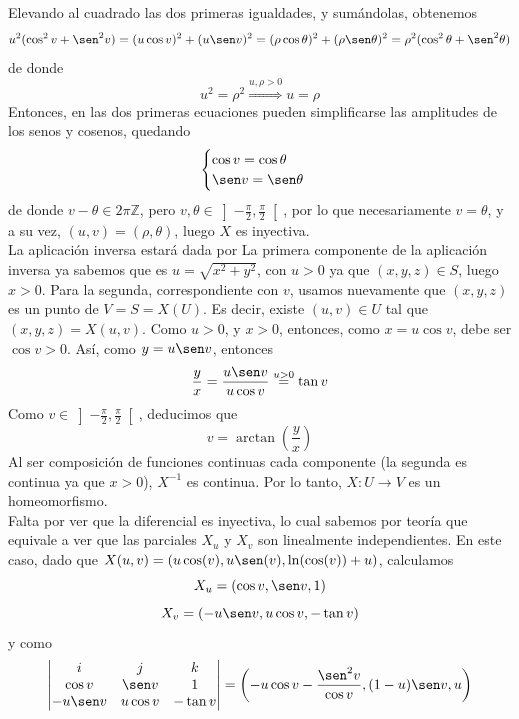 \documentclass[12pt]{article}
\newcommand{\Z}{\mathbb{Z}}
\begin{document}
\begin{ejercicio}
\begin{enumerate}
            Elevando al cuadrado las dos primeras igualdades, y sumándolas, obtenemos
            $$u^2(\cos^2 v + \sen^2 v) = (u \cos v)^2 + (u \sen v)^2 = (\rho \cos \theta)^2 + (\rho \sen \theta)^2 = \rho^2(\cos^2 \theta + \sen^2 \theta)$$
            de donde
            $$u^2 = \rho^2 \stackrel{u,\rho>0}{\Longrightarrow} u = \rho$$
            Entonces, en las dos primeras ecuaciones pueden
            simplificarse las amplitudes de los senos y cosenos, quedando
            $$\begin{cases}
                \cos v = \cos \theta \\
                \sen v = \sen \theta
            \end{cases}$$
            de donde $v - \theta \in 2 \pi \Z$, pero $v, \theta \in \left]- \frac{\pi}{2} , \frac{\pi}{2} \right[$, por lo que 
            necesariamente $v = \theta$, y a su vez, $(u, v) = (\rho, \theta)$, luego $X$ es inyectiva. \\

            La aplicación inversa estará dada por 
            La primera componente de la aplicación inversa ya sabemos que es $u = \sqrt{x^2 + y^2}$, con $u > 0$ ya que $(x,y,z) \in S$,
            luego $x > 0$. Para la segunda, correspondiente con $v$, usamos nuevamente que $(x,y,z)$ es un punto de $V = S = X(U)$. 
            Es decir, existe $(u,v) \in U$ tal que $(x,y,z) = X(u,v)$. Como $u > 0$, y $x > 0$, entonces, como $x = u \cos v$,
            debe ser $\cos v > 0$. Así, como $y = u \sen v$, entonces
            $$\dfrac{y}{x} = \dfrac{u \sen v}{u \cos v} \stackrel{u>0}{=} \tan v$$
            Como $v \in \left]- \frac{\pi}{2} , \frac{\pi}{2} \right[$, deducimos que
            $$v = \arctan \left( \dfrac{y}{x} \right)$$
            Al ser composición de funciones continuas cada componente (la segunda es continua ya que $x > 0$), $X^{-1}$ es continua. 
            Por lo tanto, $X : U \to V$ es un homeomorfismo. \\

            Falta por ver que la diferencial es inyectiva, lo cual sabemos por teoría que equivale a ver que las parciales $X_u$ y 
            $X_v$ son linealmente independientes. En este caso, dado que $X(u,v)=(u\cos(v),u\sen(v),\ln(\cos(v))+u)$, calculamos
            $$X_u = (\cos v, \sen v, 1)$$
            $$X_v = (-u \sen v, u \cos v, -\tan v)$$
            y como 
            $$\begin{vmatrix}
                i & j & k \\
                \cos v & \sen v & 1 \\
                - u \sen v & u \cos v & - \tan v
            \end{vmatrix} = \left(-u \cos v - \dfrac{\sen^2 v}{\cos v}, (1-u) \sen v, u \right)$$


\end{enumerate}
\end{ejercicio}
\end{document}
